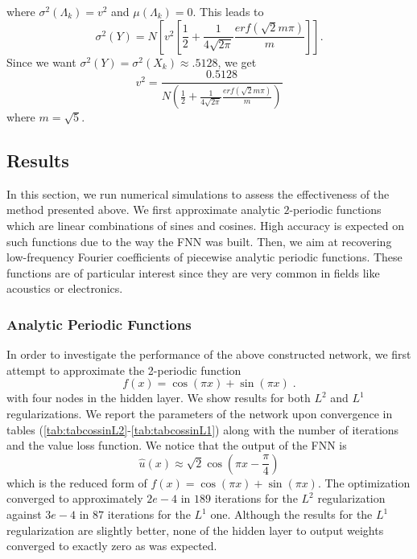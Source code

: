 \documentclass[AMS,STIX1COL]{WileyNJD-v2}
\begin{document}
    where $\sigma^2 (\Lambda_k) = v^2$ and $\mu(\Lambda_k) = 0$. This leads to
\begin{equation}\label{Eq:vary}
    \sigma^2(Y) = N\left[ v^2\left[\frac{1}{2} + \frac{1}{4\sqrt{2\pi}}\frac{erf\left(\sqrt{2}m\pi\right)}{m}\right] \right].
\end{equation}
Since we want $\sigma^2(Y) = \sigma^2(X_k) \approx .5128$, we get 
\begin{equation}\label{Eq:varweight2}
    v^2 = \frac{0.5128}{N\left(\frac{1}{2} + \frac{1}{4\sqrt{2\pi}}\frac{erf\left(\sqrt{2}m\pi\right)}{m}\right)} 
\end{equation}
where $m = \sqrt{5}$.






\subsection{Results}\label{subsec:results}
In this section, we run numerical simulations to assess the effectiveness of the method presented above. We first approximate analytic $2$-periodic functions which are linear combinations of sines and cosines. High accuracy is expected on such functions due to the way the FNN was built. Then, we aim at recovering low-frequency Fourier coefficients of piecewise analytic periodic functions. These functions are of particular interest since they are very common in fields like acoustics or electronics.
\subsubsection{Analytic Periodic Functions}
In order to investigate the performance of the above constructed network, we first attempt to approximate the 2-periodic function 
 $$
 f(x) = \cos(\pi x) + \sin(\pi x)\;.
 $$
 with four nodes in the hidden layer. We show results for both $L^2$ and $L^1$ regularizations.
We report the parameters of the network upon convergence in tables (\ref{tab:tabcossinL2}-\ref{tab:tabcossinL1}) along with the number of iterations and the value loss function. We notice that the output of the FNN is
$$\hat{u}(x) \approx \sqrt{2}\cos(\pi x - \frac{\pi}{4})$$ 
which is the reduced form of  $f(x)= \cos(\pi x) + \sin(\pi x)$. The optimization converged to approximately $2e-4$ in $189$ iterations for the $L^2$ regularization against $3e-4$ in $87$ iterations for the $L^1$ one. Although the results for the $L^1$ regularization are slightly better, none of the hidden layer to output weights converged to exactly zero as was expected.
\end{document}
